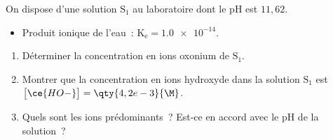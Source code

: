 On dispose d'une solution $\mathrm{S_{1}}$ au laboratoire dont le pH est
$11,62$.

\begin{donnees}
    \begin{itemize}
        \item Produit ionique de l'eau~: $\mathrm{K_{e}}=\num{1,0e-14}$.
    \end{itemize}
\end{donnees}

\begin{enumerate}
    \item Déterminer la concentration en ions oxonium de $\mathrm{S_{1}}$.
    \item Montrer que la concentration en ions hydroxyde dans la solution
          $\mathrm{S_{1}}$ est $\bigl[\ce{HO-}\bigr]=\qty{4,2e-3}{\M}$.
    \item Quels sont les ions prédominants~? Est-ce en accord avec le pH de la
        solution~?
\end{enumerate}

